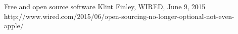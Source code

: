 \documentclass[xcolor={dvipsnames,usenames},beamer]{beamer}
\begin{document}
\begin{frame}{Free and open source software}
%
  {Klint Finley, WIRED, June 9, 2015}%
  {http://www.wired.com/2015/06/open-sourcing-no-longer-optional-not-even-apple/}








\end{frame}
\end{document}
